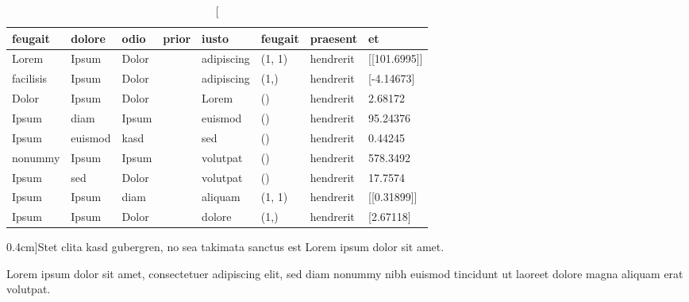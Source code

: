\begin{table}
    \centering
    \begin{tabular}{llllllll}
        \toprule
        \textbf{feugait} & \textbf{dolore} & \textbf{odio} & \textbf{prior} & \textbf{iusto} & \textbf{feugait} & \textbf{praesent} & \textbf{et} \\
        \midrule
        Lorem & Ipsum & Dolor & & adipiscing & (1, 1) & hendrerit & [[101.6995]] \\
        facilisis & Ipsum & Dolor & & adipiscing & (1,) & hendrerit & [-4.14673] \\
        Dolor & Ipsum & Dolor & & Lorem & () & hendrerit & 2.68172 \\
        Ipsum & diam & Ipsum & & euismod & () & hendrerit & 95.24376 \\
        Ipsum & euismod & kasd & & sed & () & hendrerit & 0.44245 \\
        nonummy & Ipsum & Ipsum & & volutpat & () & hendrerit & 578.3492 \\
        Ipsum & sed & Dolor & & volutpat & () & hendrerit & 17.7574 \\
        Ipsum & Ipsum & diam & & aliquam & (1, 1) & hendrerit & [[0.31899]] \\
        Ipsum & Ipsum & Dolor & & dolore & (1,) & hendrerit & [2.67118] \\
        \bottomrule
    \end{tabular}
    \caption[][0.4cm]{Stet clita kasd gubergren, no sea takimata sanctus est Lorem ipsum dolor sit amet.}
    \label{tab:table2}
\end{table}

Lorem ipsum dolor sit amet, consectetuer adipiscing elit, sed diam nonummy nibh euismod tincidunt ut laoreet dolore magna aliquam erat volutpat.   

